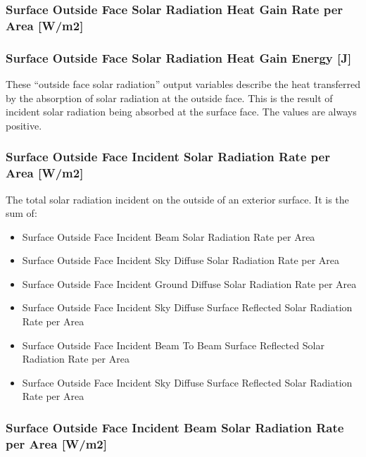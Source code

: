 \subsubsection{Surface Outside Face Solar Radiation Heat Gain Rate per Area {[}W/m2{]}}\label{surface-outside-face-solar-radiation-heat-gain-rate-per-area-wm2}

\subsubsection{Surface Outside Face Solar Radiation Heat Gain Energy {[}J{]}}\label{surface-outside-face-solar-radiation-heat-gain-energy-j}

These ``outside face solar radiation'' output variables describe the heat transferred by the absorption of solar radiation at the outside face. This is the result of incident solar radiation being absorbed at the surface face. The values are always positive.

\subsubsection{Surface Outside Face Incident Solar Radiation Rate per Area {[}W/m2{]}}\label{surface-outside-face-incident-solar-radiation-rate-per-area-wm2}

The total solar radiation incident on the outside of an exterior surface. It is the sum of:

\begin{itemize}
\item
  Surface Outside Face Incident Beam Solar Radiation Rate per Area
\item
  Surface Outside Face Incident Sky Diffuse Solar Radiation Rate per Area
\item
  Surface Outside Face Incident Ground Diffuse Solar Radiation Rate per Area
\item
  Surface Outside Face Incident Sky Diffuse Surface Reflected Solar Radiation Rate per Area
\item
  Surface Outside Face Incident Beam To Beam Surface Reflected Solar Radiation Rate per Area
\item
  Surface Outside Face Incident Sky Diffuse Surface Reflected Solar Radiation Rate per Area
\end{itemize}

\subsubsection{Surface Outside Face Incident Beam Solar Radiation Rate per Area {[}W/m2{]}}\label{surface-outside-face-incident-beam-solar-radiation-rate-per-area-wm2}

